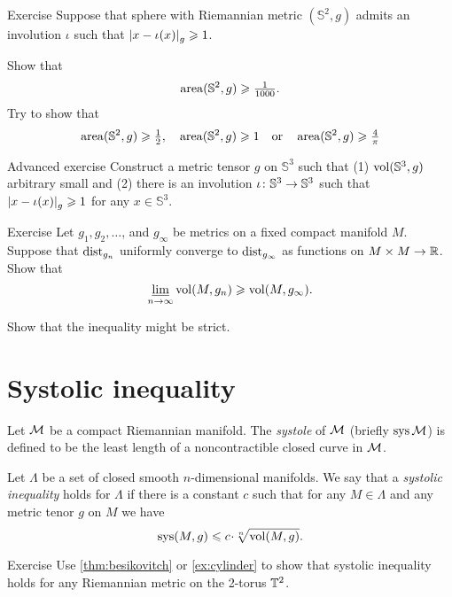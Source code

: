 \begin{thm}{Exercise}\label{ex:involution-of-sphere}
Suppose that sphere with Riemannian metric $(\mathbb{S}^2,g)$ admits an involution $\iota$ such that $\dist{x}{\iota(x)}{g}\ge 1$.

Show that 
\[\operatorname{\rm area}\nolimits(\mathbb{S}^2,g)\geqslant \tfrac1{1000}.\]
Try to show that 
\[\operatorname{\rm area}\nolimits(\mathbb{S}^2,g)\geqslant \tfrac12,\quad \operatorname{\rm area}\nolimits(\mathbb{S}^2,g)\geqslant 1\quad\text{or}\quad\operatorname{\rm area}\nolimits(\mathbb{S}^2,g)\geqslant \tfrac4\pi\]

\end{thm}

\begin{thm}{Advanced exercise}\label{ex:involution-of-3sphere}
Construct a metric tensor $g$ on $\mathbb{S}^3$ such that (1) $\operatorname{\rm vol}\nolimits(\mathbb{S}^3,g)$ arbitrary small and (2) there is an involution $\iota\:\mathbb{S}^3\z\to \mathbb{S}^3$ such that $\dist{x}{\iota(x)}{g}\ge 1$ for any $x\in \mathbb{S}^3$.
\end{thm}

\begin{thm}{Exercise}\label{ex:GH-vol}
Let $g_1,g_2,\dots$, and $g_\infty$ be metrics on a fixed compact manifold $M$.
Suppose that $\mathrm{dist}_{g_n}$ uniformly converge to $\mathrm{dist}_{g_\infty}$ as functions on $M\times M\to\mathbb{R}$.
Show that 
\[\varliminf_{n\to\infty}\operatorname{\rm vol}\nolimits(M,g_n)\geqslant \operatorname{\rm vol}\nolimits(M,g_\infty).\]

Show that the inequality might be strict.
\end{thm}

\section{Systolic inequality}

Let $\mathcal{M}$ be a compact Riemannian manifold.
The \emph{systole} of $\mathcal{M}$ (briefly $\mathop{\rm sys}\nolimits\mathcal{M}$) is defined to be the least length of a noncontractible closed curve in $\mathcal{M}$.

Let $\Lambda$ be a set of closed smooth $n$-dimensional manifolds.
We say that a \emph{systolic inequality} holds for $\Lambda$ if there is a constant $c$ such that for any $M\in \Lambda$ and any metric tenor $g$ on $M$ we have
\[\sys(M,g)\le c\cdot \sqrt[n]{\vol(M,g)}.\]

\begin{thm}{Exercise}\label{ex:sysT2}
Use \ref{thm:besikovitch} or \ref{ex:cylinder} to show that systolic inequality holds for any Riemannian metric on the 2-torus $\mathbb{T}^2$.
\end{thm}

